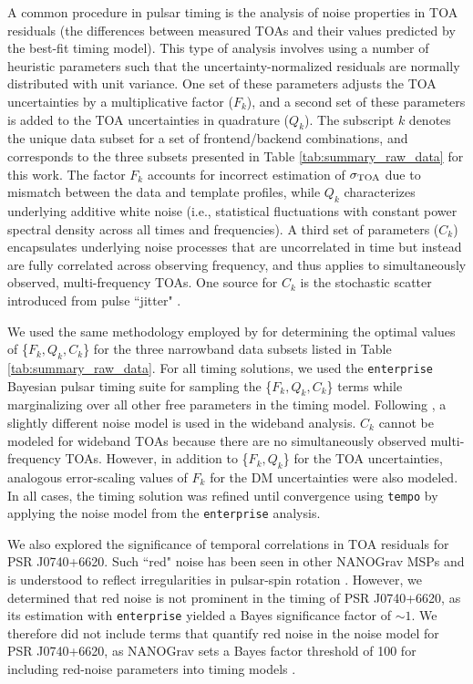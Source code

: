 \documentclass[twocolumn]{aastex63}
\begin{document}
A common procedure in pulsar timing is the analysis of noise properties in TOA residuals (the differences between measured TOAs and their values predicted by the best-fit timing model). This type of analysis involves using a number of heuristic parameters such that the uncertainty-normalized residuals are normally distributed with unit variance.  One set of these parameters adjusts the TOA uncertainties by a multiplicative factor ($F_k$), and a second set of these parameters is added to the TOA uncertainties in quadrature ($Q_k$). The subscript $k$ denotes the unique data subset for a set of frontend/backend combinations, and corresponds to the three subsets presented in Table \ref{tab:summary_raw_data} for this work. The factor $F_k$ accounts for incorrect estimation of $\sigma_{\rm TOA}$ due to mismatch between the data and template profiles, while $Q_k$ characterizes underlying additive white noise (i.e., statistical fluctuations with constant power spectral density across all times and frequencies).  A third set of parameters ($C_k$) encapsulates underlying noise processes that are uncorrelated in time but instead are fully correlated across observing frequency, and thus applies to simultaneously observed, multi-frequency TOAs.  One source for $C_k$ is the stochastic scatter introduced from pulse ``jitter" \citep[e.g.,][]{abb+15,lcc+17}.

We used the same methodology employed by \citet{aab+21a,aab+21b} for determining the optimal values of \{$F_k, Q_k, C_k$\} for the three narrowband data subsets listed in Table \ref{tab:summary_raw_data}. For all timing solutions, we used the {\tt enterprise} Bayesian pulsar timing suite \citep{evtb20} for sampling the  \{$F_k, Q_k, C_k$\} terms while marginalizing over all other free parameters in the timing model.  Following \citet{aab+21b}, a slightly different noise model is used in the wideband analysis. $C_k$ cannot be modeled for wideband TOAs because there are no simultaneously observed multi-frequency TOAs.  However, in addition to \{$F_k, Q_k$\} for the TOA uncertainties, analogous error-scaling values of $F_k$ for the DM uncertainties were also modeled. In all cases, the timing solution was refined until convergence using {\tt tempo} by applying the noise model from the {\tt enterprise} analysis.

We also explored the significance of temporal correlations in TOA residuals for PSR J0740+6620. Such ``red" noise has been seen in other NANOGrav MSPs and is understood to reflect irregularities in pulsar-spin rotation \citep{sc10}. However, we determined that red noise is not prominent in the timing of PSR J0740+6620, as its estimation with {\tt enterprise} yielded a Bayes significance factor of $\sim1$. We therefore did not include terms that quantify red noise in the noise model for PSR J0740+6620, as NANOGrav sets a Bayes factor threshold of 100 for including red-noise parameters into timing models \citep[e.g.,][]{abb+15}.
\end{document}
